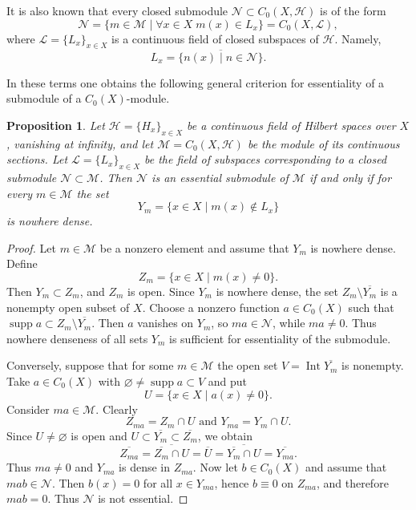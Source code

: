 \documentclass[reqno,a4paper,12pt]{amsart}
\theoremstyle{plain}
\newtheorem{proposition}[theorem]{Proposition}
\theoremstyle{definition}
\newcommand{\M}{\mathcal M}
\newcommand{\N}{\mathcal N}
\renewcommand{\emptyset}{\varnothing}
\begin{document}
	It is also known that every closed submodule $\N \subset C_0(X, \mathcal H)$ is of the form
	\[ \N = \{m \in \M \mid \forall x \in X\; m(x) \in L_x\} = C_0(X, \mathcal L), \]
	where $\mathcal L = \{L_x\}_{x \in X}$ is a continuous field of closed subspaces of $\mathcal H$.
	Namely, 
	\[ L_x = \overline{ \{ n(x) \mid n \in \N \} }. \]
	
	In these terms one obtains the following general criterion for essentiality of a submodule of a $C_0(X)$-module.
	
	\begin{proposition}
		\label{prop:criterion}
		Let $\mathcal H = \{H_x\}_{x \in X}$ be a continuous field of Hilbert spaces over $X$, vanishing at infinity, and let $\M = C_0(X, \mathcal H)$ be the module of its continuous sections.
		Let $\mathcal L = \{L_x\}_{x \in X}$ be the field of subspaces corresponding to a closed submodule $\N \subset \M$.
		Then $\N$ is an essential submodule of $\M$ if and only if for every $m \in \M$ the set
		\[ Y_m = \{ x \in X \mid m(x) \notin L_x \} \]
		is nowhere dense.
	\end{proposition}
	\begin{proof}
		Let $m \in \M$ be a nonzero element and assume that $Y_m$ is nowhere dense. Define
		\[
		Z_m = \{x \in X \mid m(x) \ne 0\}.
		\]
		Then $Y_m \subset Z_m$, and $Z_m$ is open. Since $Y_m$ is nowhere dense, the set $Z_m \setminus \overline{Y_m}$
		is a nonempty open subset of $X$.
		Choose a nonzero function $a \in C_0(X)$ such that $\operatorname{supp} a \subset Z_m \setminus \overline{Y_m}$.
		Then $a$ vanishes on $Y_m$, so $ma \in \N$, while $ma \ne 0$. Thus nowhere denseness of all sets $Y_m$ is sufficient for essentiality of the submodule.
		
		Conversely, suppose that for some $m \in \M$ the open set $V = \operatorname{Int}\overline{Y_m}$ is nonempty.
		Take $a \in C_0(X)$ with $\emptyset \ne \operatorname{supp} a \subset V$ and put
		\[
		U = \{x \in X \mid a(x) \ne 0\}.
		\]
		Consider $ma \in \M$. Clearly
		\[
		Z_{ma} = Z_m \cap U \text{ and } Y_{ma} = Y_m \cap U.
		\]
		Since $U \ne \emptyset$ is open and $U \subset \overline{Y_m} \subset \overline{Z_m}$, we obtain
		\[
		\overline{Z_{ma}} = \overline{\overline{Z_m} \cap U} = \overline U = \overline{\overline{Y_m} \cap U} = \overline{Y_{ma}}.
		\]
		Thus $ma \ne 0$ and $Y_{ma}$ is dense in $Z_{ma}$.
		Now let $b \in C_0(X)$ and assume that $mab \in \N$.
		Then $b(x)=0$ for all $x \in Y_{ma}$, hence $b \equiv 0$ on $Z_{ma}$, and therefore $mab=0$.
		Thus $\N$ is not essential.
	\end{proof}
	
\end{document}
